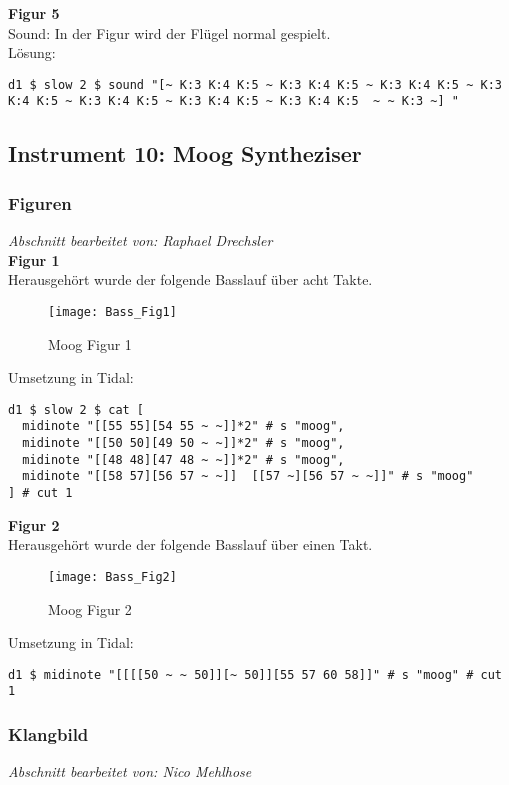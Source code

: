 \documentclass[
10pt, %
a4paper, %
oneside, %
headinclude,footinclude, %
BCOR5mm, %
]{scrartcl}
\begin{document}
\noindent \textbf{Figur 5}\\
Sound: In der Figur wird der Flügel normal gespielt.\\
Lösung:
\begin{lstlisting}
d1 $ slow 2 $ sound "[~ K:3 K:4 K:5 ~ K:3 K:4 K:5 ~ K:3 K:4 K:5 ~ K:3 K:4 K:5 ~ K:3 K:4 K:5 ~ K:3 K:4 K:5 ~ K:3 K:4 K:5  ~ ~ K:3 ~] "
\end{lstlisting}
\subsection{Instrument 10: Moog Syntheziser}
\subsubsection{Figuren}
\textit{Abschnitt bearbeitet von: Raphael Drechsler}\\

\noindent\textbf{Figur 1}\\
Herausgehört wurde der folgende Basslauf über acht Takte.\\
\begin{figure}[h]
	\centering 
	\texttt{[image: Bass\_Fig1]} 
	\caption{Moog Figur 1}
\end{figure}

\noindent Umsetzung in Tidal:
\begin{lstlisting}
d1 $ slow 2 $ cat [
  midinote "[[55 55][54 55 ~ ~]]*2" # s "moog",
  midinote "[[50 50][49 50 ~ ~]]*2" # s "moog",
  midinote "[[48 48][47 48 ~ ~]]*2" # s "moog",
  midinote "[[58 57][56 57 ~ ~]]  [[57 ~][56 57 ~ ~]]" # s "moog" 
] # cut 1
\end{lstlisting}

\noindent\textbf{Figur 2}\\
Herausgehört wurde der folgende Basslauf über einen Takt.
\begin{figure}[h]
	\centering 
	\texttt{[image: Bass\_Fig2]} 
	\caption{Moog Figur 2}
\end{figure}

\noindent Umsetzung in Tidal:
\begin{lstlisting}
d1 $ midinote "[[[[50 ~ ~ 50]][~ 50]][55 57 60 58]]" # s "moog" # cut 1
\end{lstlisting}

\subsubsection{Klangbild}
\textit{Abschnitt bearbeitet von: Nico Mehlhose}\\
\end{document}
